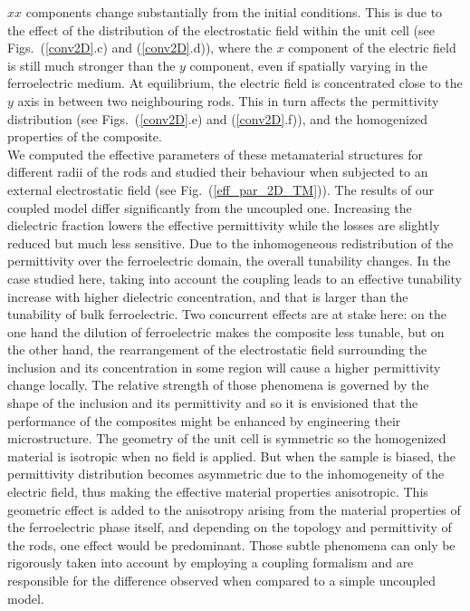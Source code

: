 \documentclass[openacc]{rsproca_new}%
\newcommand{\fig}[1]{Fig.~(\ref{#1})}
\begin{document}
$xx$ components change substantially from the initial conditions.
This is due to the effect of the distribution
of the electrostatic field within the unit cell (see Figs.~(\ref{conv2D}.c) and (\ref{conv2D}.d)),
where the $x$ component of the electric field is still much stronger
than the $y$ component, even if spatially varying in the ferroelectric medium.
At equilibrium, the electric field is concentrated close to the $y$ axis in between two neighbouring
rods. This in turn affects the permittivity distribution (see Figs.~(\ref{conv2D}.e) and (\ref{conv2D}.f)),
and the homogenized properties of the composite.\\
We computed the effective parameters of these metamaterial structures for different
radii of the rods and studied their behaviour when subjected to an external
electrostatic field (see \fig{eff_par_2D_TM}). The results of our coupled
model differ significantly from the uncoupled one. Increasing the dielectric fraction
lowers the effective permittivity while the losses are slightly reduced but much less sensitive.
Due to the inhomogeneous redistribution of the permittivity over the ferroelectric domain, the
overall tunability changes. In the case studied here, taking into account
the coupling leads to an effective tunability increase with
higher dielectric concentration, and that is larger than the tunability
 of bulk ferroelectric. Two concurrent effects are at stake here: on the one hand
the dilution of ferroelectric makes the composite less tunable, but on the other hand,
the rearrangement of the electrostatic field surrounding the inclusion and its
concentration in some region will cause a higher permittivity change locally.
The relative strength of those phenomena is governed by the shape of the inclusion and its permittivity
and so it is envisioned that the performance of the composites might be enhanced by engineering
their microstructure.
The geometry of the unit cell is symmetric so the homogenized material is
isotropic when no field is applied.
But when the sample is biased, the permittivity distribution becomes asymmetric due
to the inhomogeneity of the electric field, thus making the effective material properties anisotropic.
This geometric effect is added to the anisotropy arising from the material properties of the ferroelectric
phase itself, and depending on the topology and permittivity of the rods, one effect would be predominant.
Those subtle phenomena can only be rigorously taken into account by employing a coupling formalism
and are responsible for the difference observed when compared to a simple uncoupled model.\\
\end{document}
